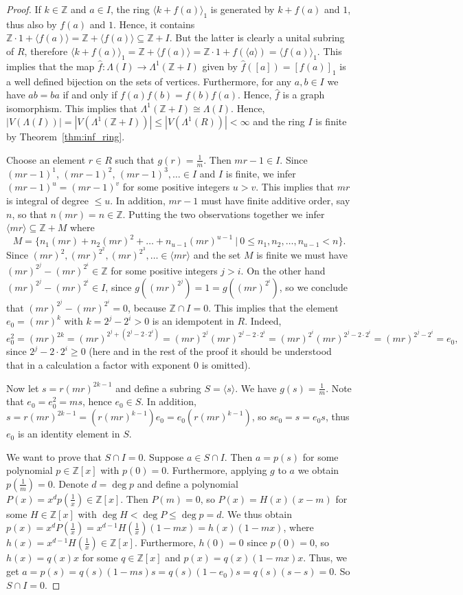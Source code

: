 \documentclass[12pt,a4paper]{amsart}
\theoremstyle{definition}
\newcommand{\Z}{\mathbb{Z}}
\newcommand{\rng}[1]{\langle #1 \rangle}
\begin{document}
\begin{proof}
If $k \in \Z$ and $a \in I$, the ring $\rng{k+f(a)}_1$ is generated by $k+f(a)$ and $1$, thus also by $f(a)$ and $1$.
Hence, it contains $\Z\cdot 1 +\rng{f(a)}=\Z + \rng{f(a)} \subseteq \Z+I$. But the latter is clearly a unital subring of $R$, therefore $\rng{k+f(a)}_1=\Z + \rng{f(a)}=\Z\cdot 1 + f(\rng{a})=\rng{f(a)}_1$.
This implies that the map $\hat{f} \colon \Lambda(I) \to \Lambda^1(\Z+I)$ given by $\hat{f}([a])=[f(a)]_1$ is a well defined bijection on the sets of vertices.
Furthermore, for any $a,b \in I$ we have $ab=ba$ if and only if $f(a)f(b)=f(b)f(a)$. Hence, $\hat{f}$ is a graph isomorphism.
This implies that $\Lambda^1(\Z+I) \cong \Lambda(I)$.
Hence, $|V(\Lambda(I))|=|V(\Lambda^1(\Z+I))| \leq |V(\Lambda^1(R))|<\infty$ and the ring $I$ is finite by Theorem~\ref{thm:inf_ring}.

Choose an element $r \in R$ such that $g(r)=\frac1m$. Then $mr-1 \in I$.
Since $(mr-1)^1$, $(mr-1)^2$, $(mr-1)^3,\ldots \in I$ and $I$ is finite, we infer $(mr-1)^u=(mr-1)^v$ for some positive integers $u>v$.
This implies that $mr$ is integral of degree $\leq u$.
In addition, $mr-1$ must have finite additive order, say $n$, so that $n(mr)=n \in \Z$.
Putting the two observations together we infer
$\rng{mr} \subseteq \Z+M$ where
$$M=\Big\{n_1(mr)+n_2(mr)^2+\ldots+n_{u-1}(mr)^{u-1} ~|~ 0 \leq n_1,n_2,\ldots,n_{u-1} <n\Big\}.$$
Since $(mr)^2,(mr)^{2^2},(mr)^{2^3},\ldots \in \rng{mr}$ and the set $M$ is finite we must have $(mr)^{2^j}-(mr)^{2^i} \in \Z$ for some positive integers $j>i$.
On the other hand $(mr)^{2^j}-(mr)^{2^i} \in I$, since $g((mr)^{2^j})=1=g((mr)^{2^i})$, so we conclude that $(mr)^{2^j}-(mr)^{2^i}=0$, because $\Z \cap I=0$.
This implies that the element $e_0=(mr)^k$ with $k=2^j-2^i>0$ is an idempotent in $R$. Indeed,
$$e_0^2=(mr)^{2k}=(mr)^{2^j+(2^j-2\cdot 2^i)}=(mr)^{2^j}(mr)^{2^j-2\cdot 2^i}=(mr)^{2^i}(mr)^{2^j-2\cdot 2^i}=(mr)^{2^j-2^i}=e_0,$$
since $2^j-2\cdot 2^i \geq 0$ (here and in the rest of the proof it should be understood that in a calculation a factor with exponent $0$ is omitted).

Now let $s=r(mr)^{2k-1}$ and define a subring $S=\rng{s}$. We have $g(s)=\frac1m$. Note that $e_0=e_0^2=ms$, hence $e_0 \in S$.
In addition, $s=r(mr)^{2k-1}=(r(mr)^{k-1})e_0=e_0(r(mr)^{k-1})$, so $se_0=s=e_0s$, thus $e_0$ is an identity element in $S$.

We want to prove that $S \cap I=0$. Suppose $a \in S \cap I$.
Then $a=p(s)$ for some polynomial $p \in \Z[x]$ with $p(0)=0$.
Furthermore, applying $g$ to $a$ we obtain $p(\frac1m)=0$.
Denote $d=\deg p$ and define a polynomial $P(x)=x^dp(\frac1x) \in \Z[x]$.
Then $P(m)=0$, so $P(x)=H(x)(x-m)$ for some $H \in \Z[x]$ with $\deg H < \deg P \leq \deg p=d$.
We thus obtain $p(x)=x^dP(\frac1x)=x^{d-1}H(\frac1x)(1-mx)=h(x)(1-mx)$, where $h(x)=x^{d-1}H(\frac1x) \in \Z[x]$.
Furthermore, $h(0)=0$ since $p(0)=0$, so $h(x)=q(x)x$ for some $q \in \Z[x]$ and $p(x)=q(x)(1-mx)x$.
Thus, we get $a=p(s)=q(s)(1-ms)s=q(s)(1-e_0)s=q(s)(s-s)=0$. So $S \cap I=0$.


\end{proof}
\end{document}
